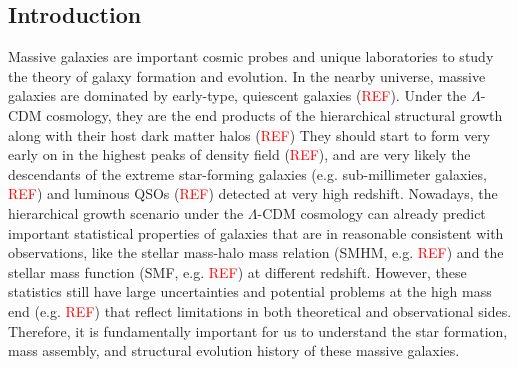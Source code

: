 \documentclass{emulateapj}
\newcommand{\addref}{{\textcolor{red}{REF}}}
\begin{document}
\begin{CJK*}{UTF8}{gbsn}
\section{Introduction}
    \label{sec:intro}
    
    Massive galaxies are important cosmic probes and unique laboratories to study the 
    theory of galaxy formation and evolution. 
    In the nearby universe, massive galaxies are dominated by early-type, quiescent 
    galaxies (\addref{}). 
    Under the $\Lambda$-CDM cosmology, they are the end products of the hierarchical
    structural growth along with their host dark matter halos (\addref{})
    They should start to form very early on in the highest peaks of density field 
    (\addref{}), and are very likely the descendants of the extreme star-forming galaxies
    (e.g. sub-millimeter galaxies, \addref{}) and luminous QSOs (\addref{}) detected at 
    very high redshift. 
    Nowadays, the hierarchical growth scenario under the $\Lambda$-CDM cosmology can 
    already predict important statistical properties of galaxies that are in reasonable
    consistent with observations, like the stellar mass-halo mass relation 
    (SMHM, e.g. \addref{}) and the stellar mass function (SMF, e.g. \addref{}) 
    at different redshift. 
    However, these statistics still have large uncertainties and potential problems at 
    the high mass end (e.g. \addref{}) that reflect limitations in both theoretical and 
    observational sides. 
    Therefore, it is fundamentally important for us to understand the star formation, mass 
    assembly, and structural evolution history of these massive galaxies. 


\end{CJK*}
\end{document}
